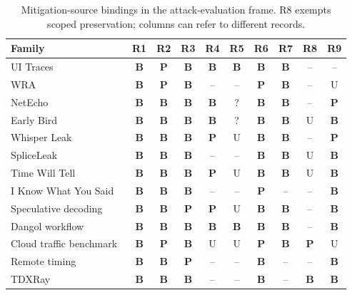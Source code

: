 \begin{table}[t]\centering\footnotesize
\caption{Mitigation-source bindings in the attack-evaluation frame. R8 exempts scoped preservation; columns can refer to different records.}\label{tab:family-audit}
\setlength{\tabcolsep}{2.2pt}
\begin{tabularx}{\columnwidth}{@{}Y*{9}{c}@{}}\toprule
Family & R1 & R2 & R3 & R4 & R5 & R6 & R7 & R8 & R9\\\midrule
UI Traces~\cite{uitraces2026} & \textbf{B} & \textbf{P} & \textbf{B} & \textbf{B} & \textbf{B} & \textbf{B} & \textbf{B} & -- & --\\
WRA~\cite{jeong2026wra} & \textbf{B} & \textbf{P} & \textbf{B} & -- & -- & \textbf{P} & \textbf{B} & -- & U\\
NetEcho~\cite{netecho2025} & \textbf{B} & \textbf{B} & \textbf{B} & \textbf{B} & ? & \textbf{B} & \textbf{B} & -- & \textbf{P}\\
Early Bird~\cite{earlybird2025} & \textbf{B} & \textbf{B} & \textbf{B} & \textbf{B} & ? & \textbf{B} & \textbf{B} & U & \textbf{B}\\
Whisper Leak~\cite{whisperleak2025} & \textbf{B} & \textbf{B} & \textbf{B} & \textbf{P} & U & \textbf{B} & \textbf{B} & -- & \textbf{P}\\
SpliceLeak~\cite{spliceleak2026} & \textbf{B} & \textbf{B} & \textbf{B} & -- & -- & \textbf{B} & \textbf{B} & U & \textbf{B}\\
Time Will Tell~\cite{timewilltell2024} & \textbf{B} & \textbf{B} & \textbf{B} & \textbf{P} & U & \textbf{B} & \textbf{B} & U & \textbf{B}\\
I Know What You Said~\cite{gao2025iknow} & \textbf{B} & \textbf{B} & \textbf{B} & -- & -- & \textbf{P} & -- & -- & \textbf{B}\\
Speculative decoding~\cite{wei2024speculation} & \textbf{B} & \textbf{B} & \textbf{P} & \textbf{P} & U & \textbf{B} & \textbf{B} & -- & \textbf{B}\\
Dangol workflow~\cite{dangol2026workflow} & \textbf{B} & \textbf{B} & \textbf{B} & \textbf{B} & \textbf{B} & \textbf{B} & \textbf{B} & -- & \textbf{B}\\
Cloud traffic benchmark~\cite{pouryousef2026traffic} & \textbf{B} & \textbf{P} & \textbf{B} & U & U & \textbf{P} & \textbf{B} & \textbf{P} & U\\
Remote timing~\cite{carlini2024remote} & \textbf{B} & \textbf{B} & \textbf{P} & -- & -- & \textbf{B} & -- & -- & \textbf{B}\\
TDXRay~\cite{hornetz2026tdxray} & \textbf{B} & \textbf{B} & \textbf{B} & -- & -- & \textbf{B} & -- & \textbf{B} & \textbf{B}\\

\end{tabularx}
\end{table}
